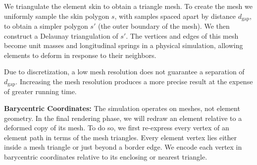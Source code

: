 We triangulate the element skin to obtain a triangle mesh.
To create the mesh we uniformly sample the skin polygon $s$, with samples
spaced apart by distance $d_\mathrm{gap}$,
to obtain a simpler polygon $s'$ (the outer boundary of the mesh).
We then construct a Delaunay triangulation of $s'$.
The vertices and edges of this mesh become unit 
masses and longitudinal
springs in a physical simulation, allowing elements to deform in response to
their neighbors.  

Due to discretization, a low mesh resolution does not guarantee a separation of $d_\mathrm{gap}$. 
Increasing the mesh resolution produces a more precise result at the expense of greater running time.

\textbf{Barycentric Coordinates:}
The simulation operates on meshes, not element geometry.  In the final
rendering phase, we will redraw an element relative to a deformed copy of
its mesh.  To do so, we first re-express every vertex of an element path in 
terms of the mesh triangles.  Every element vertex lies either inside a mesh
triangle or just beyond a border edge.  We encode each vertex in barycentric
coordinates relative to its enclosing or nearest triangle.

